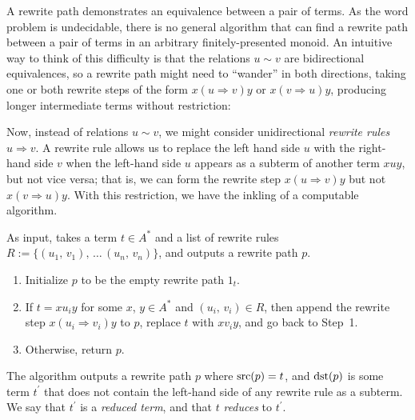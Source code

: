 \documentclass[../generics]{subfiles}
\begin{document}
A rewrite path demonstrates an equivalence between a pair of terms. As the word problem is undecidable, there is no general algorithm that can find a rewrite path between a pair of terms in an arbitrary finitely-presented monoid. An intuitive way to think of this difficulty is that the relations $u\sim v$ are bidirectional equivalences, so a rewrite path might need to ``wander'' in both directions, taking one or both rewrite steps of the form $x(u\Rightarrow v)y$ or $x(v\Rightarrow u)y$, producing longer intermediate terms without restriction:
\begin{quote}
\end{quote}
Now, instead of relations $u\sim v$, we might consider unidirectional \emph{rewrite rules} $u\Rightarrow v$. A rewrite rule allows us to replace the left hand side $u$ with the right-hand side $v$ when the left-hand side $u$ appears as a subterm of another term $xuy$, but not vice versa; that is, we can form the rewrite step $x(u\Rightarrow v)y$ but not $x(v\Rightarrow u)y$. With this restriction, we have the inkling of a computable algorithm.
\begin{algorithm}\label{term reduction algo}
As input, takes a term $t\in A^*$ and a list of rewrite rules $R:=\{(u_1,\,v_1),\,\ldots\,(u_n,\,v_n)\}$, and outputs a rewrite path $p$.
\begin{enumerate}
\item Initialize $p$ to be the empty rewrite path $1_t$.
\item If $t=xu_iy$ for some $x$, $y\in A^*$ and $(u_i,\,v_i)\in R$, then append the rewrite step $x(u_i\Rightarrow v_i)y$ to $p$, replace $t$ with $xv_iy$, and go back to Step~1.
\item Otherwise, return $p$.
\end{enumerate}
\end{algorithm}
The algorithm outputs a rewrite path $p$ where $\operatorname{src}(p)=t$, and $\operatorname{dst}(p)$ is some term $t^\prime$ that does not contain the left-hand side of any rewrite rule as a subterm. We say that $t^\prime$ is a \emph{reduced term}, and that $t$ \emph{reduces} to $t^\prime$.
\end{document}
